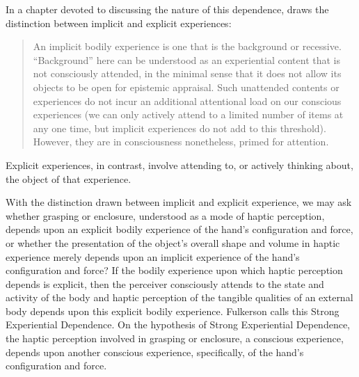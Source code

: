 In a chapter devoted to discussing the nature of this dependence, \citet[chapter 4.6]{Fulkerson:2014ek} draws the distinction between implicit and explicit experiences:
\begin{quote}
	An implicit bodily experience is one that is the background or recessive. ``Background'' here can be understood as an experiential content that is not consciously attended, in the minimal sense that it does not allow its objects to be open for epistemic appraisal. Such unattended contents or experiences do not incur an additional attentional load on our conscious experiences (we can only actively attend to a limited number of items at any one time, but implicit experiences do not add to this threshold). However, they are in consciousness nonetheless, primed for attention. \citep[90]{Fulkerson:2014ek}
\end{quote}
Explicit experiences, in contrast, involve attending to, or actively thinking about, the object of that experience. 

With the distinction drawn between implicit and explicit experience, we may ask whether grasping or enclosure, understood as a mode of haptic perception, depends upon an explicit bodily experience of the hand's configuration and force, or whether the presentation of the object's overall shape and volume in haptic experience merely depends upon an implicit experience of the hand's configuration and force? If the bodily experience upon which haptic perception depends is explicit, then the perceiver consciously attends to the state and activity of the body and haptic perception of the tangible qualities of an external body depends upon this explicit bodily experience. Fulkerson calls this Strong Experiential Dependence. On the hypothesis of Strong Experiential Dependence, the haptic perception involved in grasping or enclosure, a conscious experience, depends upon another conscious experience, specifically, of the hand's configuration and force.

